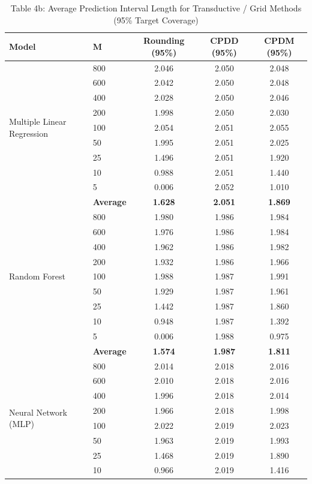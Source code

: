 \documentclass[11pt,a4paper]{article}
\begin{document}
\begin{table}[H]
\centering
\caption{Table 4b: Average Prediction Interval Length for Transductive / Grid Methods (95\% Target Coverage)}
\label{tab:4b}
\scriptsize
\begin{tabular}{llccc}
\toprule
Model & M & Rounding (95\%) & CPDD (95\%) & CPDM (95\%) \\
\midrule
\multirow{9}{*}{Multiple Linear Regression}
 & 800 & 2.046 & 2.050 & 2.048 \\
 & 600 & 2.042 & 2.050 & 2.048 \\
 & 400 & 2.028 & 2.050 & 2.046 \\
 & 200 & 1.998 & 2.050 & 2.030 \\
 & 100 & 2.054 & 2.051 & 2.055 \\
 & 50  & 1.995 & 2.051 & 2.025 \\
 & 25  & 1.496 & 2.051 & 1.920 \\
 & 10  & 0.988 & 2.051 & 1.440 \\
 & 5   & 0.006 & 2.052 & 1.010 \\
 & \textbf{Average} & \textbf{1.628} & \textbf{2.051} & \textbf{1.869} \\
\midrule
\multirow{9}{*}{Random Forest}
 & 800 & 1.980 & 1.986 & 1.984 \\
 & 600 & 1.976 & 1.986 & 1.984 \\
 & 400 & 1.962 & 1.986 & 1.982 \\
 & 200 & 1.932 & 1.986 & 1.966 \\
 & 100 & 1.988 & 1.987 & 1.991 \\
 & 50  & 1.929 & 1.987 & 1.961 \\
 & 25  & 1.442 & 1.987 & 1.860 \\
 & 10  & 0.948 & 1.987 & 1.392 \\
 & 5   & 0.006 & 1.988 & 0.975 \\
 & \textbf{Average} & \textbf{1.574} & \textbf{1.987} & \textbf{1.811} \\
\midrule
\multirow{9}{*}{Neural Network (MLP)}
 & 800 & 2.014 & 2.018 & 2.016 \\
 & 600 & 2.010 & 2.018 & 2.016 \\
 & 400 & 1.996 & 2.018 & 2.014 \\
 & 200 & 1.966 & 2.018 & 1.998 \\
 & 100 & 2.022 & 2.019 & 2.023 \\
 & 50  & 1.963 & 2.019 & 1.993 \\
 & 25  & 1.468 & 2.019 & 1.890 \\
 & 10  & 0.966 & 2.019 & 1.416 \\

\end{tabular}
\end{table}
\end{document}
